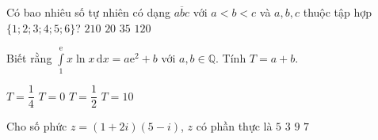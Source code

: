 \begin{ex}%
Có bao nhiêu số tự nhiên có dạng  $\overline{abc}$  với $a<b<c$ và $a, b, c$ thuộc tập hợp $\{1; 2;3; 4;5; 6\}$? 
\choice
{$210$}
{\True $20$}
{$35$}
{$120$}
\end{ex}

\begin{ex}%
Biết rằng $\displaystyle\int\limits_1^\mathrm{e} x\ln x\mathrm{\,d}x = a\mathrm{e}^2+b$ với $a,b \in \mathbb{Q}$. Tính $T=a+b$.
  
\choice
{$T=\dfrac{1}{4}$}
{$T=0$}
{\True $T=\dfrac{1}{2}$}
{$T=10$}
\end{ex}

\begin{ex}%
Cho số phức $z = (1+2i)(5- i)$, $z$ có phần thực là 
\choice
{$5$}
{$3$}
{$9$}
{\True $7$}
\end{ex}

